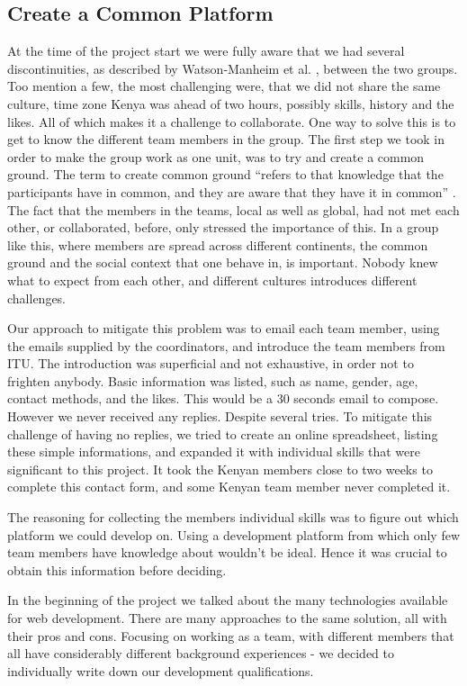 \subsection{Create a Common Platform} \label{sec:commonplatform}
At the time of the project start we were fully aware that we had several discontinuities, as described by Watson-Manheim et al. \cite{watson2007distance}, between the two groups. Too mention a few, the most challenging were, that we did not share the same culture, time zone \textemdash Kenya was ahead of two hours\textemdash, possibly skills, history and the likes. All of which makes it a challenge to collaborate. One way to solve this is to get to know the different team members in the group. The first step we took in order to make the group work as one unit, was to try and create a common ground. The term to create common ground ``refers to that knowledge that the participants have in common, and they are aware that they have it in common'' \cite{olson:2000:distance}. The fact that the members in the teams, local as well as global, had not met each other, or collaborated, before, only stressed the importance of this. In a group like this, where members are spread across different continents, the common ground and the social context that one behave in, is important. Nobody knew what to expect from each other, and different cultures introduces different challenges. 

Our approach to mitigate this problem was to email each team member, using the emails supplied by the coordinators, and introduce the team members from ITU. The introduction was superficial and not exhaustive, in order not to frighten anybody. 
Basic information was listed, such as name, gender, age, contact methods, and the likes. This would be a 30 seconds email to compose. However we never received any replies. Despite several tries. To mitigate this challenge of having no replies, we tried to create an online spreadsheet, listing these simple informations, and expanded it with individual skills that were significant to this project.
It took the Kenyan members close to two weeks to complete this contact form, and some Kenyan team member never completed it.

The reasoning for collecting the members individual skills was to figure out which platform we could develop on. Using a development platform from which only few team members have knowledge about wouldn't be ideal. Hence it was crucial to obtain this information before deciding.

In the beginning of the project we talked about the many technologies available for web development. There are many approaches to the same solution, all with their pros and cons. Focusing on working as a team, with different members that all have considerably different background experiences - we decided to individually write down our development qualifications.

